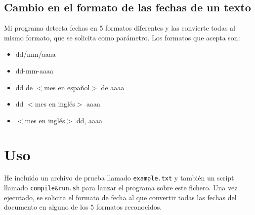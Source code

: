 \documentclass[10pt,a4paper]{article}
\begin{document}
\subsection{Cambio en el formato de las fechas de un texto}

Mi programa detecta fechas en 5 formatos diferentes y las convierte
todas al mismo formato, que se solicita como parámetro. Los formatos
que acepta son:

\begin{itemize}
\item dd/mm/aaaa
\item dd-mm-aaaa
\item dd de $<$mes en español$>$ de aaaa
\item dd $<$mes en inglés$>$ aaaa
\item $<$mes en inglés$>$ dd, aaaa
\end{itemize}

\section{Uso}

He incluido un archivo de prueba llamado {\tt example.txt} y también
un script llamado {\tt compile\&run.sh} para lanzar el programa sobre
este fichero. Una vez ejecutado, se solicita el formato de fecha al
que convertir todas las fechas del documento en alguno de los 5
formatos reconocidos.
\end{document}
